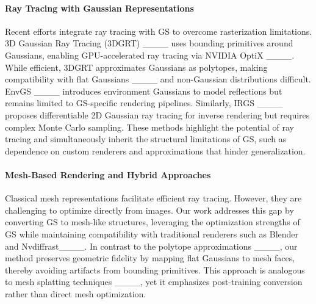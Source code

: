 \paragraph{Ray Tracing with Gaussian Representations}
Recent efforts integrate ray tracing with GS to overcome rasterization limitations. 3D Gaussian Ray Tracing (3DGRT) ____ uses bounding primitives around Gaussians, enabling GPU-accelerated ray tracing via NVIDIA OptiX ____. While efficient, 3DGRT approximates Gaussians as polytopes, making compatibility with flat Gaussians ____ and non-Gaussian distributions difficult. EnvGS ____ introduces environment Gaussians to model reflections but remains limited to GS-specific rendering pipelines. Similarly, IRGS ____ proposes differentiable 2D Gaussian ray tracing for inverse rendering but requires complex Monte Carlo sampling. These methods highlight the potential of ray tracing and simultaneously inherit the structural limitations of GS, such as dependence on custom renderers and approximations that hinder generalization.

\paragraph{Mesh-Based Rendering and Hybrid Approaches}
Classical mesh representations facilitate efficient ray tracing. However, they are challenging to optimize directly from images. Our work addresses this gap by converting GS to mesh-like structures, leveraging the optimization strengths of GS while maintaining compatibility with traditional renderers such as Blender and Nvdiffrast____. In contrast to the polytope approximations ____, our method preserves geometric fidelity by mapping flat Gaussians to mesh faces, thereby avoiding artifacts from bounding primitives. This approach is analogous to mesh splatting techniques ____, yet it emphasizes post-training conversion rather than direct mesh optimization.






